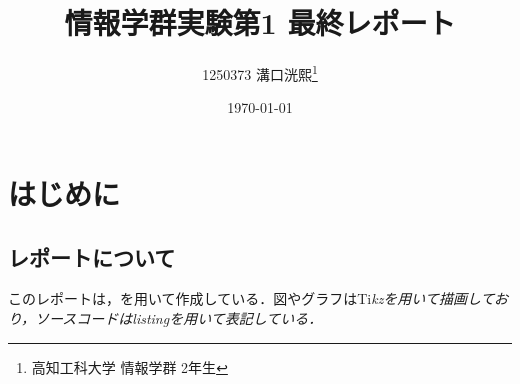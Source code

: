 \documentclass[a4j,11pt]{jsarticle}
\title{\vspace{0cm}情報学群実験第1 最終レポート}
\author{1250373 溝口洸熙\thanks{高知工科大学 情報学群 2年生}}
\date{\today}
\begin{document}
\maketitle
\begin{abstract}

\end{abstract}
\tableofcontents
\newpage
\section*{はじめに}
\subsection*{レポートについて}
このレポートは，\LaTeXe を用いて作成している．図やグラフはTi\it{k}\normalfont zを用いて描画しており，ソースコードはlistingを用いて表記している．
\end{document}
